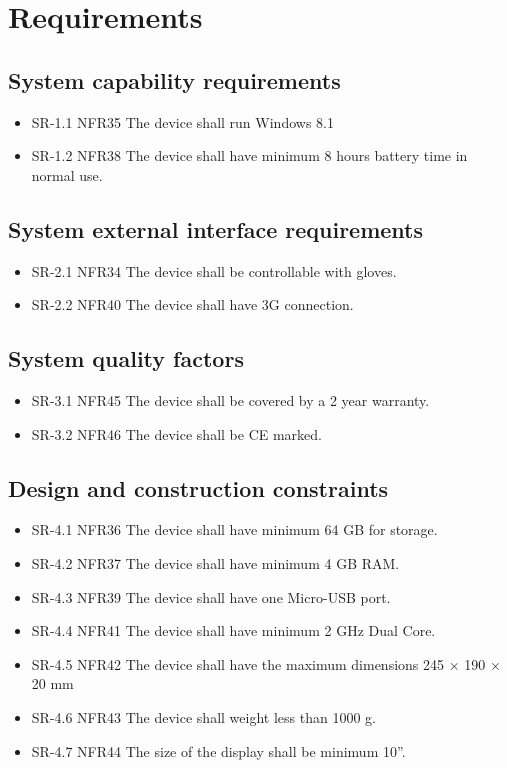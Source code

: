 \documentclass[Main]{subfiles}
\begin{document}
\setcounter{chapter}{2}
\chapter{Requirements}

\section{System capability requirements}
\begin{itemize}
\item SR-1.1 NFR35  The device shall run Windows 8.1
\item SR-1.2 NFR38  The device shall have minimum 8 hours battery time in normal use.
\end{itemize}

\section{System external interface requirements}
\begin{itemize}
\item SR-2.1 NFR34  The device shall be controllable with gloves.
\item SR-2.2 NFR40  The device shall have 3G connection.
\end{itemize}

\section{System quality factors}
\begin{itemize}
\item SR-3.1 NFR45  The device shall be covered by a 2 year warranty.
\item SR-3.2 NFR46  The device shall be CE marked.
\end{itemize}

\section{Design and construction constraints}
\begin{itemize}
\item SR-4.1 NFR36  The device shall have minimum 64 GB for storage.
\item SR-4.2 NFR37  The device shall have minimum 4 GB RAM.
\item SR-4.3 NFR39  The device shall have one Micro-USB port.
\item SR-4.4 NFR41  The device shall have minimum 2 GHz Dual Core.
\item SR-4.5 NFR42  The device shall have the maximum dimensions 245 × 190 × 20 mm
\item SR-4.6 NFR43  The device shall weight less than 1000 g.
\item SR-4.7 NFR44  The size of the display shall be minimum 10”.
\end{itemize}

\end{document}

